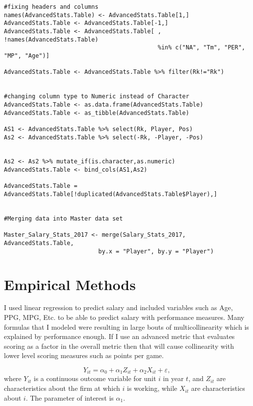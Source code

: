 \documentclass[12pt,english]{article}
\begin{document}
\begin{singlespace}
\begin{lstlisting}
#fixing headers and columns
names(AdvancedStats.Table) <- AdvancedStats.Table[1,]
AdvancedStats.Table <- AdvancedStats.Table[-1,]
AdvancedStats.Table <- AdvancedStats.Table[ , !names(AdvancedStats.Table) 
                                            %in% c("NA", "Tm", "PER", "MP", "Age")]

AdvancedStats.Table <- AdvancedStats.Table %>% filter(Rk!="Rk")


#changing column type to Numeric instead of Character
AdvancedStats.Table <- as.data.frame(AdvancedStats.Table)
AdvancedStats.Table <- as_tibble(AdvancedStats.Table)

AS1 <- AdvancedStats.Table %>% select(Rk, Player, Pos)
As2 <- AdvancedStats.Table %>% select(-Rk, -Player, -Pos)


As2 <- As2 %>% mutate_if(is.character,as.numeric)
AdvancedStats.Table <- bind_cols(AS1,As2)

AdvancedStats.Table = AdvancedStats.Table[!duplicated(AdvancedStats.Table$Player),]


#Merging data into Master data set

Master_Salary_Stats_2017 <- merge(Salary_Stats_2017, AdvancedStats.Table,
                           by.x = "Player", by.y = "Player")
\end{lstlisting}
\end{singlespace}


\lipsum[2-5]


\section{Empirical Methods}\label{sec:methods}
I used linear regression to predict salary and included variables such as Age, PPG, MPG, Etc. to be able to predict salary with performance measures. Many formulas that I modeled were resulting in large bouts of multicollinearity which is explained by performance enough. If I use an advanced metric that evaluates scoring as a factor in the overall metric then that will cause collinearity with lower level scoring measures such as points per game.

\begin{equation}
\label{eq:1}
Y_{it}=\alpha_{0} + \alpha_{1}Z_{it} + \alpha_{2} X_{it} + \varepsilon,
\end{equation}
where $Y_{it}$ is a continuous outcome variable for unit $i$ in year $t$, and $Z_{it}$ are characteristics about the firm at which $i$ is working, while $X_{it}$ are characteristics about $i$. The parameter of interest is $\alpha_{1}$.
\end{document}

